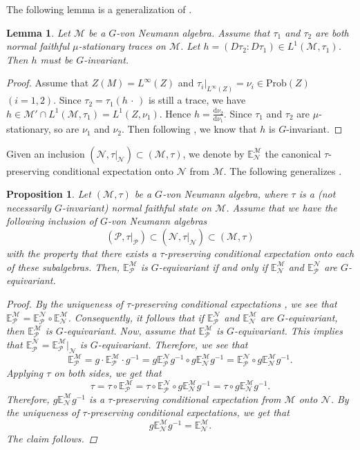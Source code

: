 \documentclass[12pt]{amsart}
\newcommand{\cM}{{\mathcal M}}
\newcommand{\cN}{{\mathcal N}}
\def\d{\mathrm{d}}
\def\Prob{\mathrm{Prob}}
\newtheorem{lemma}[thm]{Lemma}
\newtheorem{proposition}[thm]{Proposition}
\theoremstyle{definition}
\begin{document}
The following lemma is a generalization of \cite[Proposition 2.6]{BS06}.
\begin{lemma}\label{lem:h G-inv}
Let $\cM$ be a $G$-von Neumann algebra. Assume that $\tau_1$ and $\tau_2$ are both normal faithful $\mu$-stationary traces on $\cM$. Let $h=(D\tau_2:D\tau_1)\in L^1(\cM,\tau_1)$. Then $h$ must be $G$-invariant.
\end{lemma}
\begin{proof}
Assume that $Z(M)=L^\infty(Z)$ and $\tau_i|_{L^\infty(Z)}=\nu_i\in\Prob(Z)$ $(i=1,2)$. Since $\tau_2=\tau_1(h \,\cdot\,)$ is still a trace, we have $h\in \cM'\cap L^1(\cM,\tau_1)=L^1(Z,\nu_1)$. Hence $h=\frac{\d\nu_2}{\d \nu_1}$. Since $\tau_1$ and $\tau_2$ are $\mu$-stationary, so are $\nu_1$ and $\nu_2$. Then following \cite[Proposition 2.6]{BS06}, we know that $h$ is $G$-invariant.
\end{proof}

Given an inclusion $(\mathcal{N},\tau|_{\cN})\subset(\mathcal{M},\tau)$, we denote by $\mathbb{E}_{\cN}^{\cM}$ the canonical $\tau$-preserving conditional expectation onto $\cN$ from $\cM$. The following generalizes \cite[Lemma~2.2]{BS06}.
\begin{proposition}
\label{prop:commutingequivariance}
Let $(\mathcal{M},\tau)$ be a $G$-von Neumann algebra, where $\tau$ is a (not necessarily $G$-invariant) normal faithful state on $\cM$. Assume that we have the following inclusion of $G$-von Neumann algebras
\[(\mathcal{P},\tau|_{\mathcal{P}})\subset(\mathcal{N},\tau|_{\cN})\subset(\mathcal{M},\tau)\]
with the property that there exists a $\tau$-preserving conditional expectation onto each of these subalgebras. Then, $\mathbb{E}_{\mathcal{P}}^{\cM}$ is $G$-equivariant if and only if $\mathbb{E}_{\mathcal{N}}^{\cM}$ and $\mathbb{E}_{\mathcal{P}}^{\cN}$ are $G$-equivariant. 
\begin{proof} By the uniqueness of $\tau$-preserving conditional expectations \cite[Theorem IX.4.2]{TakesakiBookII}, we see that $\mathbb{E}_{\mathcal{P}}^{\cM}=\mathbb{E}_{\mathcal{P}}^{\cN}\circ\mathbb{E}_{\cN}^{\cM}$. Consequently, it follows that if $\mathbb{E}_{\mathcal{P}}^{\cN}$ and $\mathbb{E}_{\cN}^{\cM}$ are $G$-equivariant, then $\mathbb{E}_{\mathcal{P}}^{\cM}$ is $G$-equivariant. Now, assume that $\mathbb{E}_{\mathcal{P}}^{\cM}$ is $G$-equivariant. This implies that $\mathbb{E}_{\mathcal{P}}^\cN=\mathbb{E}_{\mathcal{P}}^\cM|_{\cN}$ is $G$-equivariant. Therefore, we see that
\[
\mathbb{E}_{\mathcal{P}}^{\cM}= g \cdot \mathbb{E}_{\mathcal{P}}^{\cM} \cdot g^{-1}= g \mathbb{E}_{\mathcal{P}}^\cN g^{-1}\circ g \mathbb{E}_{\cN}^{\cM} g^{-1}=\mathbb{E}_{\mathcal{P}}^\cN\circ
g \mathbb{E}_{\cN}^{\cM} g^{-1}.\]
Applying $\tau$ on both sides, we get that
\[\tau=\tau\circ \mathbb{E}_{\mathcal{P}}^{\cM}=\tau \circ \mathbb{E}_{\mathcal{P}}^\cN\circ
g \mathbb{E}_{\cN}^{\cM} g^{-1}=\tau\circ
g \mathbb{E}_{\cN}^{\cM} g^{-1}.
\]
Therefore, $g \mathbb{E}_{\cN}^{\cM} g^{-1}$ is a $\tau$-preserving conditional expectation from $\cM$ onto $\cN$. By the uniqueness of $\tau$-preserving conditional expectations, we get that
\[g \mathbb{E}_{\cN}^{\cM} g^{-1}=\mathbb{E}_{\cN}^{\cM}.
\]
The claim follows.
    \end{proof}    
\end{proposition}
\end{document}
